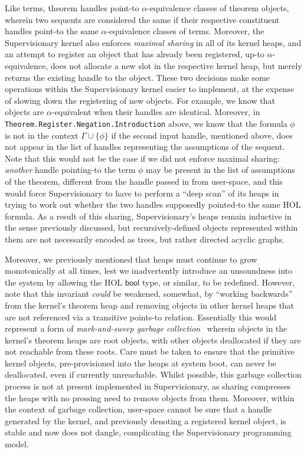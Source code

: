 \documentclass[a4paper, UKenglish, cleveref, autoref, thm-restate, colorlinks]{lipics-v2021}
\begin{document}
Like terms, theorem handles point-to $\alpha$-equivalence classes of theorem objects, wherein two sequents are considered the same if their respective constituent handles point-to the same $\alpha$-equivalence classes of terms.
Moreover, the Supervisionary kernel also enforces \emph{maximal sharing} in all of its kernel heaps, and an attempt to register an object that has already been registered, up-to $\alpha$-equivalence, does not allocate a new slot in the respective kernel heap, but merely returns the existing handle to the object.
These two decisions make some operations within the Supervisionary kernel easier to implement, at the expense of slowing down the registering of new objects.
For example, we know that objects are $\alpha$-equivalent when their handles are identical.
Moreover, in \texttt{Theorem.Register.Negation.Introduction} above, we know that the formula $\phi$ is not in the context $\Gamma \cup \{ \phi \}$ if the second input handle, mentioned above, does not appear in the list of handles representing the assumptions of the sequent.
Note that this would not be the case if we did not enforce maximal sharing: \emph{another} handle pointing-to the term $\phi$ may be present in the list of assumptions of the theorem, different from the handle passed in from user-space, and this would force Supervisionary to have to perform a ``deep scan'' of its heaps in trying to work out whether the two handles supposedly pointed-to the same HOL formula.
As a result of this sharing, Supervisionary's heaps remain inductive in the sense previously discussed, but recursively-defined objects represented within them are not necessarily encoded as trees, but rather directed acyclic graphs.

Moreover, we previously mentioned that heaps must continue to grow monotonically at all times, lest we inadvertently introduce an unsoundness into the system by allowing the HOL $\mathsf{bool}$ type, or similar, to be redefined.
However, note that this invariant \emph{could} be weakened, somewhat, by ``working backwards'' from the kernel's theorem heap and removing objects in other kernel heaps that are not referenced via a transitive points-to relation.
Essentially this would represent a form of \emph{mark-and-sweep garbage collection}~\cite{DBLP:books/crc/CRCcompiler2007/SanyalK07} wherein objects in the kernel's theorem heaps are root objects, with other objects deallocated if they are not reachable from these roots.
Care must be taken to ensure that the primitive kernel objects, pre-provisioned into the heaps at system boot, can never be deallocated, even if currently unreachable.
Whilst possible, this garbage collection process is not at present implemented in Supervisionary, as sharing compresses the heaps with no pressing need to remove objects from them.
Moreover, within the context of garbage collection, user-space cannot be sure that a handle generated by the kernel, and previously denoting a registered kernel object, is stable and now does not dangle, complicating the Supervisionary programming model.
\end{document}
